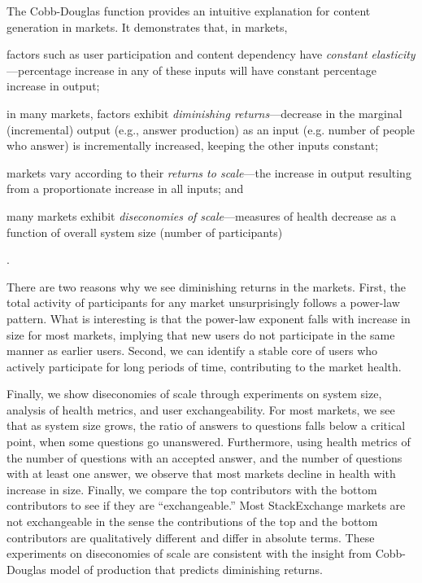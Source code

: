The Cobb-Douglas function provides an intuitive explanation for content generation in  markets. It demonstrates that, in  markets, \begin{enumerate*}
  \item factors such as user participation and content dependency have \emph{constant elasticity}---percentage increase in any of these inputs will have constant percentage increase in output;
  \item in many markets, factors exhibit \emph{diminishing returns}---decrease in the marginal (incremental) output (e.g., answer production) as an input (e.g. number of people who answer) is incrementally increased, keeping the other inputs constant;
  \item markets vary according to their \emph{returns to scale}---the increase in output resulting from a proportionate increase in all inputs; and
  \item many markets exhibit \emph{diseconomies of scale}---measures of
   health decrease as a function of overall
   system size (number of participants)
 \end{enumerate*}.

There are two reasons why we see diminishing returns in the  markets. First, the total activity of participants for any  market unsurprisingly follows a power-law pattern. What is interesting is that the power-law exponent falls with increase in size for most markets, implying that new users do not participate in the same manner as earlier users. Second, we can identify a stable core of users who actively participate for long periods of time, contributing to the market health.

Finally, we show diseconomies of scale through experiments on system size, analysis of health metrics, and user exchangeability. For most  markets, we see that as system size grows, the ratio of answers to questions falls below a critical point, when some questions go unanswered. Furthermore, using health metrics of the number of questions with an accepted answer, and the number of questions with at least one answer, we observe that most  markets decline in health with increase in size. Finally, we compare the top contributors with the bottom contributors to see if they are ``exchangeable.'' Most StackExchange markets are not exchangeable in the sense the contributions of the top and the bottom contributors are qualitatively different and differ in absolute terms. These experiments on diseconomies of scale are consistent with the insight from Cobb-Douglas model of production that predicts diminishing returns.

